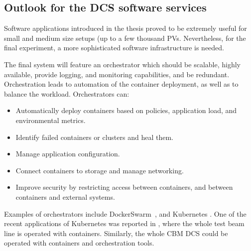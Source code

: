 \subsection{Outlook for the DCS software services} 
Software applications introduced in the thesis proved to be extremely useful for small and medium size setups (up to a few thousand \glspl{PV}. Nevertheless, for the final experiment, a more sophisticated software infrastructure is needed.

The final system will feature an orchestrator which should be scalable, highly available, provide logging, and monitoring capabilities, and be redundant. Orchestration leads to automation of the container deployment, as well as to balance the workload. Orchestrators can:
 \begin{itemize}
     \item Automatically deploy containers based on policies, application load, and environmental metrics.
     \item Identify failed containers or clusters and heal them.
     \item Manage application configuration.
     \item Connect containers to storage and manage networking.
     \item Improve security by restricting access between containers, and between containers and external systems.
 \end{itemize}

 Examples of orchestrators include DockerSwarm~\cite{DockerSwarm}, and Kubernetes \cite{Kubernetes}. One of the recent applications of Kubernetes was reported in \cite{ICALEPCS2021:Diamond}, where the whole test beam line is operated with containers. Similarly, the whole \gls{CBM} \gls{DCS} could be operated with containers and orchestration tools. 


